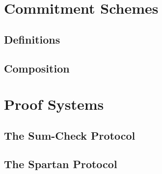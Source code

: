 




\chapter{Commitment Schemes}

\section{Definitions}

\section{Composition}



\chapter{Proof Systems}

\section{The Sum-Check Protocol}

\section{The Spartan Protocol}

